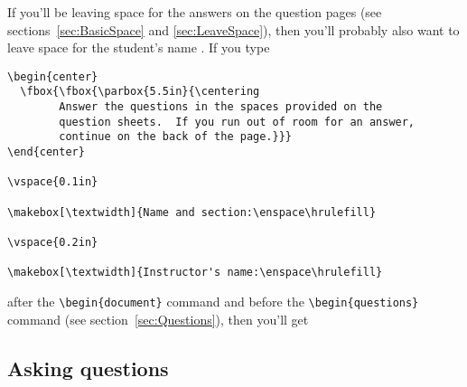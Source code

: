 \documentclass[12pt]{exam}
\begin{document}
If you'll be leaving space for the answers on the question pages (see
sections~\ref{sec:BasicSpace} and \ref{sec:LeaveSpace}), then you'll
probably also want to leave space for the student's name%
.  If you type
\begin{verbatim}
\begin{center}
  \fbox{\fbox{\parbox{5.5in}{\centering
        Answer the questions in the spaces provided on the
        question sheets.  If you run out of room for an answer,
        continue on the back of the page.}}}
\end{center}

\vspace{0.1in}

\makebox[\textwidth]{Name and section:\enspace\hrulefill}

\vspace{0.2in}

\makebox[\textwidth]{Instructor's name:\enspace\hrulefill}
\end{verbatim}
after the \verb"\begin{document}" command and before the
\verb"\begin{questions}" command (see section~\ref{sec:Questions}),
then you'll get\\
\noindent
\parbox{\textwidth}{
\begin{center}
\end{center}

\vspace{0.1in}


\vspace{0.2in}

}

\subsection{Asking questions}
\label{sec:BasicQuestions}
\end{document}
